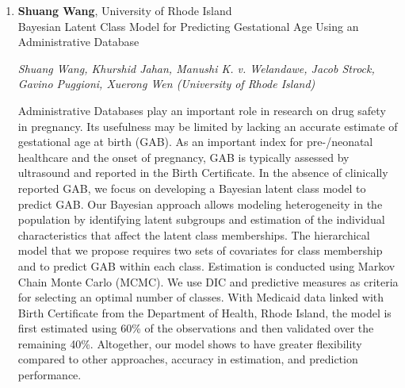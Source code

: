\begin{enumerate}
\emph{\footnotesize Stephen Bates (Stanford); Emmanuel Cand\u00e8s (Stanford); Lucas Janson (Harvard); Wenshuo Wang (Harvard)}

Model-X knockoffs is a wrapper that transforms essentially any feature importance measure into a variable selection algorithm, which discovers true effects while rigorously controlling the expected fraction of false positives. A frequently discussed challenge to apply this method is to construct knockoff variables, which are synthetic variables obeying a crucial exchangeability property with the explanatory variables under study. This paper introduces techniques for knockoff generation in great generality: we provide a sequential characterization of all possible knockoff distributions, which leads to a Metropolis–Hastings formulation of an exact knockoff sampler. We further show how to use conditional independence structure to speed up computations. Combining these two threads, we introduce an explicit set of sequential algorithms and empirically demonstrate their effectiveness. Our theoretical analysis proves that our algorithms achieve near-optimal computational complexity in certain cases. The techniques we develop are sufficiently rich to enable knockoff sampling in challenging models including cases where the covariates are continuous and heavy-tailed, and follow a graphical model such as the Ising model.

\item \textbf{Shuang Wang}, University of Rhode Island \\
Bayesian Latent Class Model for Predicting Gestational Age Using an Administrative Database

\emph{\footnotesize Shuang Wang, Khurshid Jahan, Manushi K. v. Welandawe, Jacob Strock, Gavino Puggioni, Xuerong Wen (University of Rhode Island)}

Administrative Databases play an important role in research on drug safety in pregnancy. Its usefulness may be limited by lacking an accurate estimate of gestational age at birth (GAB). As an important index for pre-/neonatal healthcare and the onset of pregnancy, GAB is typically assessed by ultrasound and reported in the Birth Certificate. In the absence of clinically reported GAB, we focus on developing a Bayesian latent class model to predict GAB. Our Bayesian approach allows modeling heterogeneity in the population by identifying latent subgroups and estimation of the individual characteristics that affect the latent class memberships. The hierarchical model that we propose requires two sets of covariates for class membership and to predict GAB within each class. Estimation is conducted using Markov Chain Monte Carlo (MCMC). We use DIC and predictive measures as criteria for selecting an optimal number of classes. With Medicaid data linked with Birth Certificate from the Department of Health, Rhode Island, the model is first estimated using 60\% of the observations and then validated over the remaining 40\%. Altogether, our model shows to have greater flexibility compared to other approaches, accuracy in estimation, and prediction performance.


\end{enumerate}
